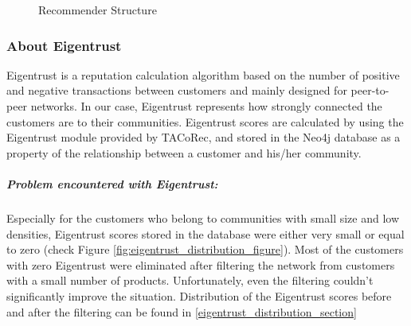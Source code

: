 \label{eigentrust_section}
	\begin{figure}[H]
		\centering
		\caption{Recommender Structure}
		\label{fig:eigentrust_structure}
	\end{figure}
	\subsubsection{About Eigentrust} \label{about_eigentrust}
	Eigentrust\cite{Eigentrust} is a reputation calculation algorithm based on the number of positive and negative transactions between customers and mainly designed for peer-to-peer networks. In our case, Eigentrust represents how strongly connected the customers are to their communities. Eigentrust scores are calculated by using the Eigentrust module provided by TACoRec, and stored in the Neo4j database as a property of the relationship between a customer and his/her community. 
	\subparagraph{Problem encountered with Eigentrust:}
	Especially for the customers who belong to communities with small size and low densities, Eigentrust scores stored in the database were either very small or equal to zero (check Figure \ref{fig:eigentrust_distribution_figure}). Most of the customers with zero Eigentrust were eliminated after filtering the network from customers with a small number of products. Unfortunately, even the filtering couldn't significantly improve the situation. Distribution of the Eigentrust scores before and after the filtering can be found in \ref{eigentrust_distribution_section}

